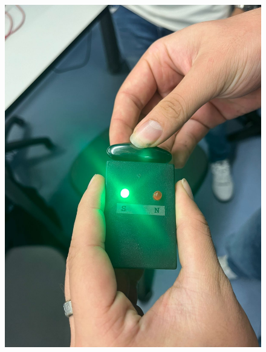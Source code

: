 \begin{figure}[H]
\begin{minipage}{0.3\textwidth}
    \includegraphics[width=\textwidth]{Figures/1. Content/BuscarPolaridad3.jpeg}
    \label{fig: Polaridad Positiva del Iman 3}
  \end{minipage}
  \hfill
  \begin{minipage}{0.3\textwidth}
    \centering

\end{minipage}
\end{figure}
